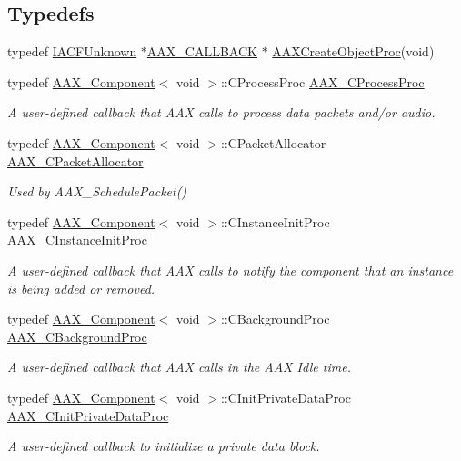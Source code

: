 \subsection*{Typedefs}
\begin{DoxyCompactItemize}
\item 
typedef \hyperlink{a00146}{I\+A\+C\+F\+Unknown} $\ast$\hyperlink{a00149_aaa22112139aa627574b1ef562f579d43}{A\+A\+X\+\_\+\+C\+A\+L\+L\+B\+A\+C\+K} $\ast$ \hyperlink{a00163_ad02e57363d002e60ca822c728896a3c4}{A\+A\+X\+Create\+Object\+Proc}(void)
\item 
typedef \hyperlink{a00029}{A\+A\+X\+\_\+\+Component}$<$ void $>$\+::C\+Process\+Proc \hyperlink{a00163_ad6dd5e1aa5bd2f8462966685e3b26a6e}{A\+A\+X\+\_\+\+C\+Process\+Proc}
\begin{DoxyCompactList}\small\item\em A user-\/defined callback that A\+A\+X calls to process data packets and/or audio. \end{DoxyCompactList}\item 
typedef \hyperlink{a00029}{A\+A\+X\+\_\+\+Component}$<$ void $>$\+::C\+Packet\+Allocator \hyperlink{a00163_a5c9c7cdc36d5459fa77e5dedb06d161a}{A\+A\+X\+\_\+\+C\+Packet\+Allocator}
\begin{DoxyCompactList}\small\item\em Used by A\+A\+X\+\_\+\+Schedule\+Packet() \end{DoxyCompactList}\item 
typedef \hyperlink{a00029}{A\+A\+X\+\_\+\+Component}$<$ void $>$\+::C\+Instance\+Init\+Proc \hyperlink{a00163_a3963a850079d3186e08c97a1a4d0ef1c}{A\+A\+X\+\_\+\+C\+Instance\+Init\+Proc}
\begin{DoxyCompactList}\small\item\em A user-\/defined callback that A\+A\+X calls to notify the component that an instance is being added or removed. \end{DoxyCompactList}\item 
typedef \hyperlink{a00029}{A\+A\+X\+\_\+\+Component}$<$ void $>$\+::C\+Background\+Proc \hyperlink{a00163_aa64561d963284a3124a0821e7dc79c9a}{A\+A\+X\+\_\+\+C\+Background\+Proc}
\begin{DoxyCompactList}\small\item\em A user-\/defined callback that A\+A\+X calls in the A\+A\+X Idle time. \end{DoxyCompactList}\item 
typedef \hyperlink{a00029}{A\+A\+X\+\_\+\+Component}$<$ void $>$\+::C\+Init\+Private\+Data\+Proc \hyperlink{a00163_adfb5d89b9d957c541fc98fe42bc050c4}{A\+A\+X\+\_\+\+C\+Init\+Private\+Data\+Proc}
\begin{DoxyCompactList}\small\item\em A user-\/defined callback to initialize a private data block. \end{DoxyCompactList}\end{DoxyCompactItemize}
